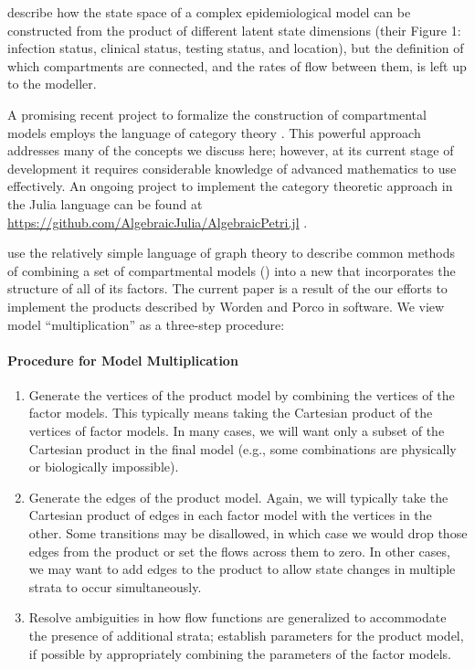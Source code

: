 \cite{friston2020dynamic} describe how the state space of a complex epidemiological model can be constructed from the product of different latent state dimensions (their Figure 1: infection status, clinical status, testing status, and location), but the definition of which compartments are connected, and the rates of flow between them, is left up to the modeller.

A promising recent project to formalize the construction of compartmental models employs the language of category theory \citep{fong2018seven, Libkind2022an, libkind2021operadic, baez2023categorical, baez2017compositional}. This powerful approach addresses many of the concepts we discuss here; however, at its current stage of development it requires considerable knowledge of advanced mathematics to use effectively.  An ongoing project to implement the category theoretic approach in the Julia language can be found at \url{https://github.com/AlgebraicJulia/AlgebraicPetri.jl} \citep{algebraicjulia}. 

\cite{worden2017products} use the relatively simple language of graph theory to describe common methods of combining a set of compartmental models () into a new  that incorporates the structure of all of its factors. The current paper is a result of the our efforts to implement the products described by Worden and Porco in software. We view model ``multiplication'' as a three-step procedure:

\paragraph{Procedure for Model Multiplication}\label{genproc}

\begin{enumerate}
    \item Generate the vertices of the product model by combining the vertices of the factor models. This typically means taking the Cartesian product of the vertices of factor models. In many cases, we will want only a subset of the Cartesian product in the final model (e.g., some combinations are physically or biologically impossible).
    \item Generate the edges of the product model. Again, we will typically take the Cartesian product of edges in each factor model with the vertices in the other. Some transitions may be disallowed, in which case we would drop those edges from the product or set the flows across them to zero. In other cases, we may want to add edges to the product to allow state changes in multiple strata to occur simultaneously.
    \item Resolve ambiguities in how flow functions are generalized to accommodate the presence of additional strata; establish parameters for the product model, if possible by appropriately combining the parameters of the factor models.
\end{enumerate}


